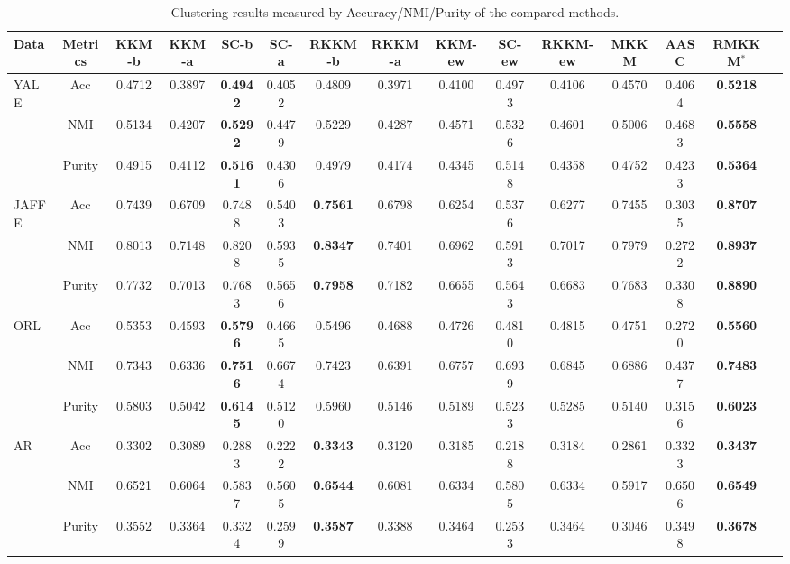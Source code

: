 \documentclass{article}
\begin{document}
\begin{table}[!htb]
\centering
\caption{Clustering results measured by Accuracy/NMI/Purity of the compared methods.}
\label{table:res_aio}
\setlength{\tabcolsep}{2.0pt}
\begin{tabular}{l c c c c c c c c c c c c c c}
        \toprule
        \small{Data} & \small{Metrics} & \small{KKM-b} & \small{KKM-a} & \small{SC-b} & \small{SC-a} & \small{RKKM-b} & \small{RKKM-a} & \small{KKM-ew} & \small{SC-ew} & \small{RKKM-ew}& \small{MKKM} & \small{AASC} & \small{RMKKM}$^*$ \\
        \midrule
        \multirow{3}{*}{\small{YALE}} & Acc & 0.4712&0.3897&\textbf{0.4942}&0.4052&0.4809&0.3971&0.4100&0.4973&0.4106&0.4570&0.4064&\textbf{0.5218}\\
		& NMI & 0.5134&0.4207&\textbf{0.5292}&0.4479&0.5229&0.4287&0.4571&0.5326&0.4601&0.5006&0.4683&\textbf{0.5558}\\
		& Purity &0.4915&0.4112&\textbf{0.5161}&0.4306&0.4979&0.4174&0.4345&0.5148&0.4358&0.4752&0.4233&\textbf{0.5364}\\
		\midrule
		\multirow{3}{*}{\small{JAFFE}} & Acc & 0.7439&0.6709&0.7488&0.5403&\textbf{0.7561}&0.6798&0.6254&0.5376&0.6277&0.7455&0.3035&\textbf{0.8707}\\
		& NMI & 0.8013&0.7148&0.8208&0.5935&\textbf{0.8347}&0.7401&0.6962&0.5913&0.7017&0.7979&0.2722&\textbf{0.8937}\\
		& Purity & 0.7732&0.7013&0.7683&0.5656&\textbf{0.7958}&0.7182&0.6655&0.5643&0.6683&0.7683&0.3308&\textbf{0.8890}\\
		\midrule
        \multirow{3}{*}{\small{ORL}} & Acc & 0.5353&0.4593&\textbf{0.5796}&0.4665&0.5496&0.4688&0.4726&0.4810&0.4815&0.4751&0.2720&\textbf{0.5560}\\
		& NMI& 0.7343&0.6336&\textbf{0.7516}&0.6674&0.7423&0.6391&0.6757&0.6939&0.6845&0.6886&0.4377&\textbf{0.7483}\\
		& Purity & 0.5803&0.5042&\textbf{0.6145}&0.5120&0.5960&0.5146&0.5189&0.5233&0.5285&0.5140&0.3156&\textbf{0.6023}\\
		\midrule
        \multirow{3}{*}{\small{AR}} & Acc & 0.3302&0.3089&0.2883&0.2222&\textbf{0.3343} &0.3120&0.3185&0.2188&0.3184&0.2861&0.3323&\textbf{0.3437}\\
		& NMI & 0.6521&0.6064&0.5837&0.5605&\textbf{0.6544} &0.6081&0.6334&0.5805&0.6334&0.5917&0.6506&\textbf{0.6549}\\
		& Purity & 0.3552&0.3364&0.3324&0.2599&\textbf{0.3587} &0.3388&0.3464&0.2533&0.3464&0.3046&0.3498&\textbf{0.3678} \\

\end{tabular}
\end{table}
\end{document}
